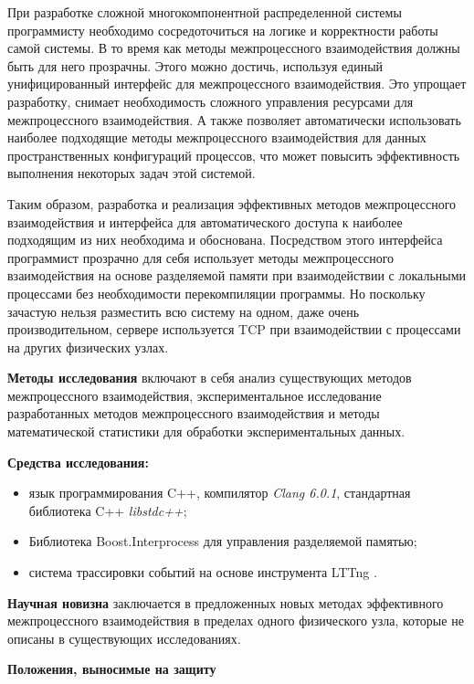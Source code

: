 При разработке сложной многокомпонентной распределенной системы программисту необходимо сосредоточиться на логике и корректности работы самой системы. В то время как методы межпроцессного взаимодействия должны быть для него прозрачны. Этого можно достичь, используя единый унифицированный интерфейс для межпроцессного взаимодействия. Это упрощает разработку, снимает необходимость сложного управления ресурсами для межпроцессного взаимодействия. А также позволяет автоматически использовать наиболее подходящие методы межпроцессного взаимодействия для данных пространственных конфигураций 
процессов, что может повысить эффективность выполнения некоторых задач этой системой.

Таким образом, разработка и реализация эффективных методов межпроцессного взаимодействия и интерфейса для автоматического доступа к наиболее подходящим из них необходима и обоснована. Посредством этого интерфейса программист прозрачно для себя использует методы межпроцессного взаимодействия на основе разделяемой памяти при взаимодействии с локальными процессами без необходимости перекомпиляции программы. Но поскольку зачастую нельзя разместить всю систему на одном, даже очень производительном, сервере используется TCP при взаимодействии с процессами на других физических узлах.

\textbf{Методы исследования} включают в себя анализ существующих методов межпроцессного взаимодействия, экспериментальное исследование разработанных методов межпроцессного взаимодействия и методы математической статистики для обработки экспериментальных данных.

\textbf{Средства исследования:}
\begin{itemize}
\item язык программирования C++, компилятор \textit{Clang 6.0.1}, стандартная библиотека C++ \textit{libstdc++};
\item Библиотека Boost.Interprocess \cite{BoostInterprocess} для управления разделяемой памятью;
\item система трассировки событий \cite{LTTngThesis} на основе инструмента LTTng \cite{LTTngSite}.
\end{itemize}

\textbf{Научная новизна} заключается в предложенных новых методах эффективного межпроцессного взаимодействия в пределах одного физического узла, которые не описаны в существующих исследованиях.

\textbf{Положения, выносимые на защиту}

